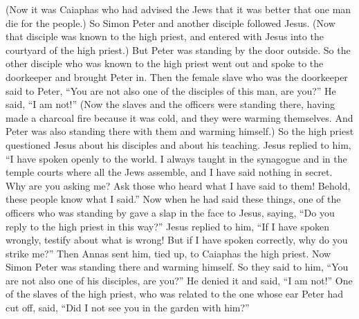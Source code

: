 \begin{biblechapter}
\verse (Now it was Caiaphas who had advised the Jews that it was better that one man die for the people.)
 So Simon Peter and another disciple followed Jesus. (Now that disciple was known to the high priest, and entered with Jesus into the courtyard of the high priest.)
\verse But Peter was standing by the door outside. So the other disciple who was known to the high priest went out and spoke to the doorkeeper and brought Peter in.
\verse Then the female slave who was the doorkeeper said to Peter, “You are not also one of the disciples of this man, are you?” He said, “I am not!”
\verse (Now the slaves and the officers were standing there, having made a charcoal fire because it was cold, and they were warming themselves. And Peter was also standing there with them and warming himself.)
 So the high priest questioned Jesus about his disciples and about his teaching.
\verse Jesus replied to him, “I have spoken openly to the world. I always taught in the synagogue and in the temple courts where all the Jews assemble, and I have said nothing in secret.
\verse Why are you asking me? Ask those who heard what I have said to them! Behold, these people know what I said.”
\verse Now when he had said these things, one of the officers who was standing by gave a slap in the face to Jesus, saying, “Do you reply to the high priest in this way?”
\verse Jesus replied to him, “If I have spoken wrongly, testify about what is wrong! But if I have spoken correctly, why do you strike me?”
\verse Then Annas sent him, tied up, to Caiaphas the high priest.
 Now Simon Peter was standing there and warming himself. So they said to him, “You are not also one of his disciples, are you?” He denied it and said, “I am not!”
\verse One of the slaves of the high priest, who was related to the one whose ear Peter had cut off, said, “Did I not see you in the garden with him?”

\end{biblechapter}
